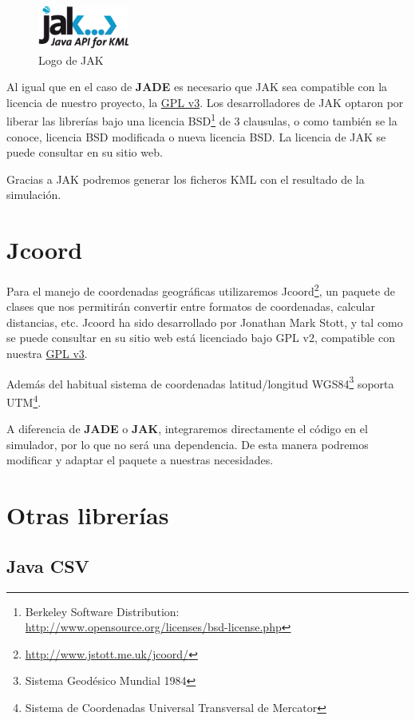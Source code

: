 \begin{figure}[H]
 \centering
 \includegraphics[width=30mm]{figuras/cap4/jak.png}
 \caption{Logo de JAK}
\end{figure}

Al igual que en el caso de {\bf JADE} es necesario que JAK sea compatible con
la licencia de nuestro proyecto, la \hyperref[ap1]{GPL v3}.
Los desarrolladores de JAK optaron por liberar las librerías bajo una licencia
BSD\footnote{Berkeley Software Distribution:\\
\hspace*{7mm}\url{http://www.opensource.org/licenses/bsd-license.php}} de 3
clausulas, o como también se la conoce, licencia BSD modificada o nueva licencia
BSD. La licencia de JAK se puede consultar en su sitio web.

Gracias a JAK podremos generar los ficheros KML con el resultado de la
simulación.

\section{Jcoord}

Para el manejo de coordenadas geográficas utilizaremos
Jcoord\footnote{\url{http://www.jstott.me.uk/jcoord/}}, un paquete de clases que
nos permitirán convertir entre formatos de coordenadas, calcular distancias,
etc. Jcoord ha sido desarrollado por Jonathan Mark Stott, y tal como se puede
consultar en su sitio web está licenciado bajo GPL v2, compatible con nuestra
\hyperref[ap1]{GPL v3}.

Además del habitual sistema de coordenadas latitud/longitud
WGS84\footnote{Sistema Geodésico Mundial 1984} soporta UTM\footnote{Sistema de
Coordenadas Universal Transversal de Mercator}.

A diferencia de {\bf JADE} o {\bf JAK}, integraremos directamente el código en
el simulador, por lo que no será una dependencia. De esta manera podremos
modificar y adaptar el paquete a nuestras necesidades.

\section{Otras librerías}

\subsection{Java CSV}

